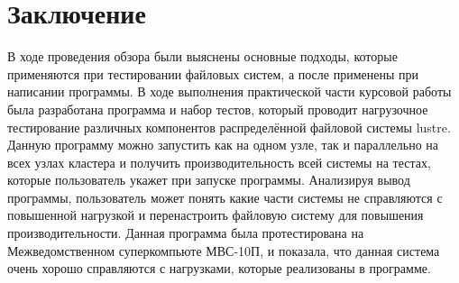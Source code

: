 \section{Заключение}
\label{sec:Chapter5} 

В ходе проведения обзора были выяснены основные подходы, которые применяются при тестировании 
файловых систем, а после применены при написании программы.  В ходе выполнения практической части
курсовой работы была разработана программа и набор тестов, который проводит нагрузочное тестирование
различных компонентов распределённой файловой системы lustre. Данную программу можно запустить как на одном узле,
так и  параллельно на всех узлах кластера и получить производительность всей системы на тестах, которые пользователь
укажет при запуске программы. Анализируя вывод программы, пользователь может понять какие части системы не
справляются с повышенной нагрузкой и перенастроить файловую систему для повышения производительности.
Данная программа была протестирована на Межведомственном суперкомпьюте МВС-10П, и показала, что данная
система очень хорошо справляются с нагрузками, которые реализованы в программе.


